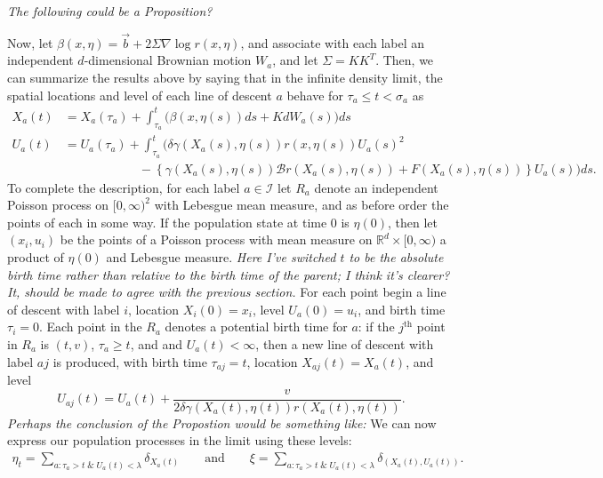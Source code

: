 \documentclass[12pt]{article}
\newcommand{\IR}{\mathbb R}
\newcommand{\grad}{\nabla}
\newcommand{\DG}{\mathcal{B}}  %
\newcommand{\meanq}{\vec b}    %
\newcommand{\covq}{\Sigma}     %
\newcommand{\lp}{\xi}              %
\newcommand{\labelspace}{\mathcal{I}} %
\newcommand{\comment}[1]{{\color{blue} \it #1}}
\begin{document}
\comment{The following could be a Proposition?}

Now, let $\beta(x, \eta) = \meanq + 2 \Sigma \grad \log r(x, \eta)$,
and associate with each label an independent $d$-dimensional Brownian motion $W_a$,
and let $\covq = K K^T$.
Then, we can summarize the results above by saying that
in the infinite density limit,
the spatial locations and level of each line of descent $a$
behave for $\tau_a \le t < \sigma_a$ as
\begin{align*}
X_a(t)
    &=
    X_a(\tau_a)
    + \int_{\tau_a}^{t}
    \bigg(
        \beta(x, \eta(s)) ds
        +
        K dW_a(s)
    \bigg)
    ds  \\
U_a(t)
    &=
    U_a(\tau_a)
    + \int_{\tau_a}^{t}
    \bigg(
        \delta \gamma(X_a(s),\eta(s))
        r(x,\eta(s)) U_a(s)^2
\\ &\qquad \qquad \qquad {}   
        -
        \left\{
            \gamma(X_a(s),\eta(s)) \DG r(X_a(s),\eta(s))
            + F(X_a(s), \eta(s))
        \right\}
        U_a(s)
    \bigg)
    ds .
\end{align*}
To complete the description,
for each label $a \in \labelspace$ let $R_a$ denote an independent Poisson process on $[0, \infty)^2$
with Lebesgue mean measure,
and as before order the points of each in some way.
If the population state at time 0 is $\eta(0)$,
then let $(x_i, u_i)$ be the points of a Poisson process
with mean measure on $\IR^d \times [0, \infty)$ a product of $\eta(0)$ and Lebesgue measure.
\comment{Here I've switched $t$ to be the absolute birth time
rather than relative to the birth time of the parent; I think it's clearer?
It, should be made to agree with the previous section.}
For each point begin a line of descent
with label $i$, location $X_i(0) = x_i$, level $U_a(0) = u_i$, and birth time $\tau_i = 0$.
Each point in the $R_a$ denotes a potential birth time for $a$:
if the $j^\text{th}$ point in $R_a$ is $(t, v)$,
$\tau_a \ge t$, and and $U_a(t) < \infty$,
then a new line of descent with label $aj$ is produced,
with birth time $\tau_{aj} = t$, location $X_{aj}(t) = X_a(t)$, and level
$$
    U_{aj}(t) = U_a(t)
    + \frac{v}{ 2 \delta \gamma(X_a(t), \eta(t)) r(X_a(t), \eta(t)) } .
$$
\comment{Perhaps the conclusion of the Propostion would be something like:}
We can now express our population processes in the limit using these levels:
\begin{align*}
    \eta_t = \sum_{a : \tau_a > t \;\&\; U_a(t) < \lambda} \delta_{X_a(t)}
    \qquad \text{and} \qquad
    \lp = \sum_{a : \tau_a > t \;\&\; U_a(t) < \lambda} \delta_{(X_a(t), U_a(t))} .
\end{align*}
\end{document}
